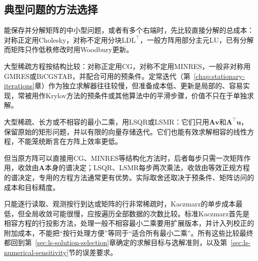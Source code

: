 \subsection{典型问题的方法选择}
\label{sec:ls-method-selection-scenarios}

能保存并分解矩阵的中小型问题，或者有多个右端时，先比较直接分解的总成本：对称正定用Cholesky，对称不定用分块$\mathrm{LDL}^\top$，一般方阵用部分主元LU，已有分解而矩阵只作低秩修改时用Woodbury更新。

大型稀疏方程按结构比较：对称正定用CG，对称不定用MINRES，一般非对称用GMRES或BiCGSTAB，并配合可用的预条件。定常迭代（第~\ref{chap:stationary-iterations}章）作为独立求解器往往较慢，但准备成本低、更新是局部的、容易实现，常被用作Krylov方法的预条件或其他算法中的平滑步骤，价值不只在于单独求解。

大型稀疏、长方或不相容的最小二乘，用LSQR或LSMR：它们只用$\bm A\bm v$和$\bm A^\top\bm u$，保留原始的矩形问题，并以有限的向量存储迭代。它们也能有效求解相容的线性方程，不能笼统断言在方阵上效率更低。

但当原方阵可以直接用CG、MINRES等结构化方法时，后者每步只需一次矩阵作用，收敛由$\bm A$本身的谱决定；LSQR、LSMR每步两次乘法，收敛由等效正规方程的谱决定，专用的方程方法通常更有优势。实际取舍还取决于预条件、矩阵访问的成本和目标精度。

只能逐行读取、观测按行到达或矩阵的行非常稀疏时，Kaczmarz的单步成本最低，但全局收敛可能很慢，应按遍历全部数据的次数比较。标准Kaczmarz首先是相容方程的行投影方法，处理一般不相容最小二乘要用扩展版本，并计入列校正的附加成本，不能把“按行处理方便”等同于“适合所有最小二乘”。所有这些比较最终都回到第~\ref{sec:ls-solution-selection}章确定的求解目标与选解准则，以及第~\ref{sec:ls-numerical-sensitivity}节的误差要求。
